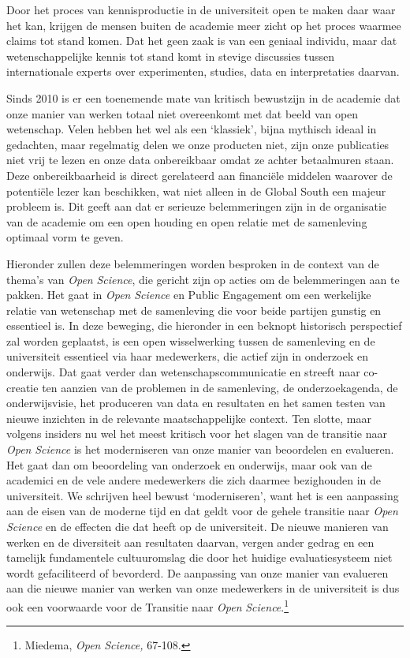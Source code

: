\documentclass[smallauthor, chapterhaspagenum, nochapterinheader, pagenuminheader,  bigchapnum,medium2, tocpages,  garamond, titleinheader]{jote-book}
\begin{document}
	Door het proces van kennisproductie in de universiteit open te maken daar waar het kan, krijgen de mensen buiten de academie meer zicht op het proces waarmee claims tot stand komen. Dat het geen zaak is van een geniaal individu, maar dat wetenschappelijke kennis tot stand komt in stevige discussies tussen internationale experts over experimenten, studies, data en interpretaties daarvan.



	Sinds 2010 is er een toenemende mate van kritisch bewustzijn in de academie dat onze manier van werken totaal niet overeenkomt met dat beeld van open wetenschap. Velen hebben het wel als een ‘klassiek', bijna mythisch ideaal in gedachten, maar regelmatig delen we onze producten niet, zijn onze publicaties niet vrij te lezen en onze data onbereikbaar omdat ze achter betaalmuren staan. Deze onbereikbaarheid is direct gerelateerd aan financiële middelen waarover de potentiële lezer kan beschikken, wat niet alleen in de Global South een majeur probleem is. Dit geeft aan dat er serieuze belemmeringen zijn in de organisatie van de academie om een open houding en open relatie met de samenleving optimaal vorm te geven.



	Hieronder zullen deze belemmeringen worden besproken in de context van de thema's van \emph{Open }\emph{Science}, die gericht zijn op acties om de belemmeringen aan te pakken. Het gaat in \emph{Open }\emph{Science} en Public Engagement om een werkelijke relatie van wetenschap met de samenleving die voor beide partijen gunstig en essentieel is. In deze beweging, die hieronder in een beknopt historisch perspectief zal worden geplaatst, is een open wisselwerking tussen de samenleving en de universiteit essentieel via haar medewerkers, die actief zijn in onderzoek en onderwijs. Dat gaat verder dan wetenschapscommunicatie en streeft naar co-creatie ten aanzien van de problemen in de samenleving, de onderzoekagenda, de onderwijsvisie, het produceren van data en resultaten en het samen testen van nieuwe inzichten in de relevante maatschappelijke context. Ten slotte, maar volgens insiders nu wel het meest kritisch voor het slagen van de transitie naar \emph{Open }\emph{Science} is het moderniseren van onze manier van beoordelen en evalueren. Het gaat dan om beoordeling van onderzoek en onderwijs, maar ook van de academici en de vele andere medewerkers die zich daarmee bezighouden in de universiteit. We schrijven heel bewust ‘moderniseren', want het is een aanpassing aan de eisen van de moderne tijd en dat geldt voor de gehele transitie naar \emph{Open }\emph{Science} en de effecten die dat heeft op de universiteit. De nieuwe manieren van werken en de diversiteit aan resultaten daarvan, vergen ander gedrag en een tamelijk fundamentele cultuuromslag die door het huidige evaluatiesysteem niet wordt gefaciliteerd of bevorderd. De aanpassing van onze manier van evalueren aan die nieuwe manier van werken van onze medewerkers in de universiteit is dus ook een voorwaarde voor de Transitie naar \emph{Open }\emph{Science}.\footnote{Miedema, \emph{Open }\emph{Science}\emph{, }67-108.}
\end{document}
